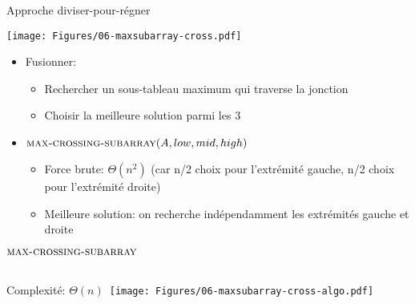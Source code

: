 \begin{frame}{Approche diviser-pour-régner}

\centerline{\texttt{[image: Figures/06-maxsubarray-cross.pdf]}}

\bigskip

\begin{itemize}
\item Fusionner:
\begin{itemize}
\item Rechercher un sous-tableau maximum qui traverse la jonction
\item Choisir la meilleure solution parmi les 3
\end{itemize}
\item $\textnormal{\scshape max-crossing-subarray}(A,low,mid,high)$
\begin{itemize}
\item Force brute: $\Theta(n^2)$ (car n/2 choix pour l'extrémité gauche, n/2 choix pour l'extrémité droite)
\item Meilleure solution: on recherche indépendamment les extrémités gauche et droite
\end{itemize}
\end{itemize}

\end{frame}

\begin{frame}{$\textnormal{\scshape max-crossing-subarray}$}

{\footnotesize
{}
}\\
\vspace{-0.5cm}
Complexité: $\Theta(n)$~\hfill\texttt{[image: Figures/06-maxsubarray-cross-algo.pdf]}
\end{frame}

